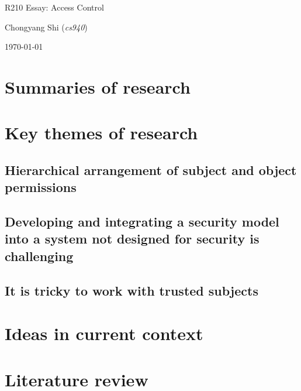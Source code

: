 \documentclass[11pt]{article}
\begin{document}
\centerline{\Large R210 Essay:  Access Control}
\vspace{2em}
\centerline{\large Chongyang Shi (\emph{cs940})}
\vspace{1em}
\centerline{\large \today}
\vspace{1em}

\section{Summaries of research}



\section{Key themes of research}

\subsection{Hierarchical arrangement of subject and object permissions}

\subsection{Developing and integrating a security model into a system not designed for security is challenging}

\subsection{It is tricky to work with trusted subjects}
 
\section{Ideas in current context}

\section{Literature review}




\footnotesize{}
\end{document}
